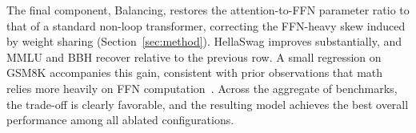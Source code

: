 
The final component, Balancing, restores the attention-to-FFN parameter ratio to that of a standard non-loop transformer, correcting the FFN-heavy skew induced by weight sharing (Section~\ref{sec:method}). HellaSwag improves substantially, and MMLU and BBH recover relative to the previous row. A small regression on GSM8K accompanies this gain, consistent with prior observations that math relies more heavily on FFN computation~\cite{geva2021transformer, jin2025disentangling}. Across the aggregate of benchmarks, the trade-off is clearly favorable, and the resulting model achieves the best overall performance among all ablated configurations.